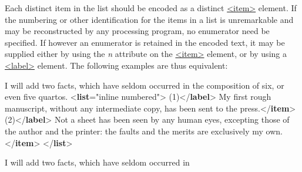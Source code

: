 Each distinct item in the list should be encoded as a distinct \hyperref[TEI.item]{<item>} element. If the numbering or other identification for the items in a list is unremarkable and may be reconstructed by any processing program, no enumerator need be specified. If however an enumerator is retained in the encoded text, it may be supplied either by using the {\itshape n} attribute on the \hyperref[TEI.item]{<item>} element, or by using a \hyperref[TEI.label]{<label>} element. The following examples are thus equivalent: \par\bgroup{}\exampleFont \begin{shaded}\noindent\mbox{}I will add two facts, which have seldom occurred in\mbox{}\newline 
 the composition of six, or even five quartos.\mbox{}\newline 
{<\textbf{list}\hspace*{1em}{rend}="{inline numbered}">}\mbox{}\newline 
{}(1){</\textbf{label}>}\mbox{}\newline 
{}My first rough manuscript, without any\mbox{}\newline 
\hspace*{1em}\hspace*{1em} intermediate copy, has been sent to the press.{</\textbf{item}>}\mbox{}\newline 
{}(2){</\textbf{label}>}\mbox{}\newline 
{}Not a sheet has been seen by any human\mbox{}\newline 
\hspace*{1em}\hspace*{1em} eyes, excepting those of the author and the printer:\mbox{}\newline 
\hspace*{1em}\hspace*{1em} the faults and the merits are exclusively my own.{</\textbf{item}>}\mbox{}\newline 
{</\textbf{list}>}\end{shaded}\egroup\par \noindent  \par\bgroup{}\exampleFont \begin{shaded}\noindent\mbox{}I will add two facts, which have seldom occurred in\mbox{}\newline 

\end{shaded}
